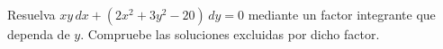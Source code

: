 Resuelva $xy\,dx+(2x^2+3y^2-20)\,dy=0$ mediante un factor integrante que dependa de $y$. Compruebe las soluciones excluidas por dicho factor.
